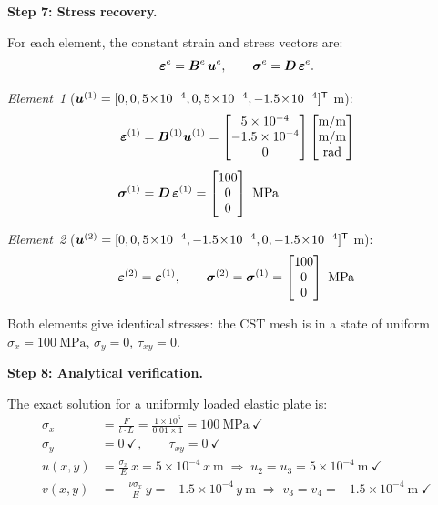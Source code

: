 \begin{example}
\medskip
\noindent\textbf{Step 7: Stress recovery.}

For each element, the constant strain and stress vectors are:
\[
    \bm{\varepsilon}^e = \bm{B}^e\,\bm{u}^e, \qquad
    \bm{\sigma}^e = \bm{D}\,\bm{\varepsilon}^e .
\]

\noindent\textit{Element~1} ($\bm{u}^{(1)} = [0,0,5\!\times\!10^{-4},0,5\!\times\!10^{-4},-1.5\!\times\!10^{-4}]^{\mathsf{T}}$ m):
\begin{align*}
    \bm{\varepsilon}^{(1)} &= \bm{B}^{(1)}\bm{u}^{(1)}
    = \begin{bmatrix}5\times10^{-4} \\ -1.5\times10^{-4} \\ 0\end{bmatrix}
    \begin{bmatrix}\text{m/m}\\\text{m/m}\\\text{rad}\end{bmatrix} \\[4pt]
    \bm{\sigma}^{(1)} &= \bm{D}\,\bm{\varepsilon}^{(1)}
    = \begin{bmatrix}100 \\ 0 \\ 0\end{bmatrix}\ \text{MPa}
\end{align*}

\noindent\textit{Element~2} ($\bm{u}^{(2)} = [0,0,5\!\times\!10^{-4},-1.5\!\times\!10^{-4},0,-1.5\!\times\!10^{-4}]^{\mathsf{T}}$ m):
\[
    \bm{\varepsilon}^{(2)} = \bm{\varepsilon}^{(1)}, \qquad
    \bm{\sigma}^{(2)} = \bm{\sigma}^{(1)} =
    \begin{bmatrix}100 \\ 0 \\ 0\end{bmatrix}\ \text{MPa}
\]

Both elements give identical stresses: the CST mesh is in a state of uniform
$\sigma_x = 100\ \text{MPa}$, $\sigma_y = 0$, $\tau_{xy} = 0$.

\medskip
\noindent\textbf{Step 8: Analytical verification.}

The exact solution for a uniformly loaded elastic plate is:
\begin{align*}
    \sigma_x &= \frac{F}{t \cdot L} = \frac{1\times10^6}{0.01 \times 1}
              = 100\ \text{MPa}\ \checkmark \\
    \sigma_y &= 0\ \checkmark, \qquad \tau_{xy} = 0\ \checkmark \\[4pt]
    u(x,y) &= \frac{\sigma_x}{E}\,x = 5\times10^{-4}\,x\ \text{m}
              \;\Rightarrow\; u_2 = u_3 = 5\times10^{-4}\ \text{m}\ \checkmark \\
    v(x,y) &= -\frac{\nu\sigma_x}{E}\,y = -1.5\times10^{-4}\,y\ \text{m}
              \;\Rightarrow\; v_3 = v_4 = -1.5\times10^{-4}\ \text{m}\ \checkmark
\end{align*}


\end{example}
